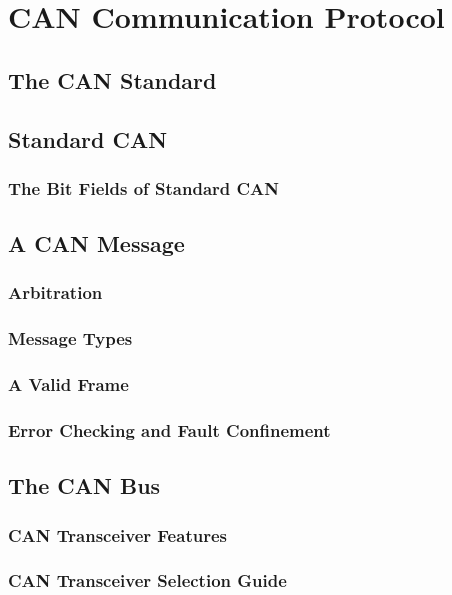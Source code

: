 
\section{CAN Communication Protocol}

\subsection{The CAN Standard }
\subsection{Standard CAN }
\subsubsection{The Bit Fields of Standard CAN}
\subsection{A CAN Message }
\subsubsection{Arbitration}
\subsubsection{Message Types}
\subsubsection{A Valid Frame}
\subsubsection{Error Checking and Fault Confinement}
\subsection{The CAN Bus}
\subsubsection{CAN Transceiver Features}
\subsubsection{CAN Transceiver Selection Guide }



 